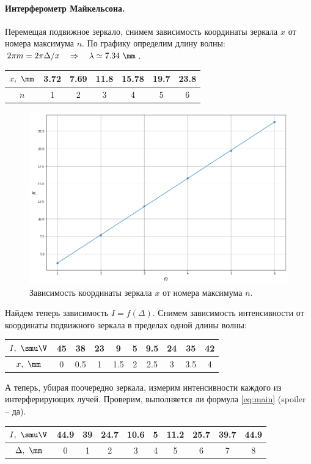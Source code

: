 \documentclass{../lab_class}
\begin{document}
\paragraph{Интерферометр Майкельсона.}
Перемещая подвижное зеркало, снимем зависимость координаты зеркала $x$ от номера максимума $n$. По графику определим длину волны: $2 \pi m = 2 \pi \Delta / x \then \lambda \simeq 7.34 \ \mm$.

\begin{center}
	\begin{tabular}{|c|c|c|c|c|c|c|}
		\hline
		$x, \ \mm$ & 3.72 & 7.69 & 11.8 & 15.78 & 19.7 & 23.8 \\ \hline
		$n$ & 1 & 2 & 3 & 4 & 5 & 6  \\ \hline
	\end{tabular}
\end{center}

\begin{figure}[H]
	\centering
	\includegraphics[width = 0.65 \textwidth]{pic03.png}
	\caption{Зависимость координаты зеркала $x$ от номера максимума $n$.}
\end{figure}

Найдем теперь зависимость $I = f(\Delta)$. Снимем зависимость интенсивности от координаты подвижного зеркала в пределах одной длины волны:
\begin{center}
	\begin{tabular}{|c|c|c|c|c|c|c|c|c|c|}
		\hline
		$I, \ \smu \V$ & 45 & 38 & 23 & 9 & 5 & 9.5 & 24 & 35 & 42 \\ \hline
		$x, \ \mm$ & 0 & 0.5 & 1 & 1.5 & 2 & 2.5 & 3 & 3.5 & 4 \\ \hline
	\end{tabular}
\end{center}

А теперь, убирая поочередно зеркала, измерим интенсивности каждого из интерферирующих лучей. Проверим, выполняется ли формула \ref{eq:main} (spoiler -- да).
\begin{center}
	\begin{tabular}{|c|c|c|c|c|c|c|c|c|c|}
		\hline
		$I, \ \smu \V$ & 44.9 & 39 & 24.7 & 10.6 & 5 & 11.2 & 25.7 & 39.7 & 44.9 \\ \hline
		$\Delta, \ \mm$ & 0 & 1 & 2 & 3 & 4 & 5 & 6 & 7 & 8 \\ \hline
	\end{tabular}
\end{center}
\end{document}

